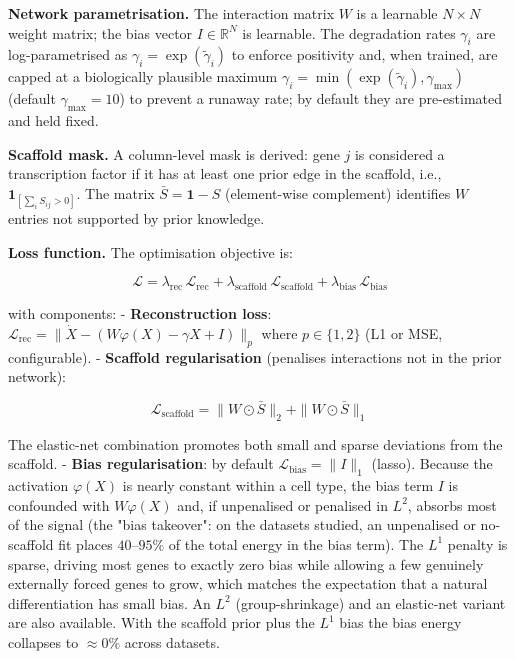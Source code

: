 \documentclass[11pt]{article}
\begin{document}
\textbf{Network parametrisation.} The interaction matrix $W$ is a learnable $N \times N$ weight matrix; the bias vector $I \in \mathbb{R}^N$ is learnable. The degradation rates $\gamma_i$ are log-parametrised as $\gamma_i = \exp(\tilde{\gamma}_i)$ to enforce positivity and, when trained, are capped at a biologically plausible maximum $\gamma_i = \min(\exp(\tilde{\gamma}_i), \gamma_{\max})$ (default $\gamma_{\max}=10$) to prevent a runaway rate; by default they are pre-estimated and held fixed.

\textbf{Scaffold mask.} A column-level mask is derived: gene $j$ is considered a transcription factor if it has at least one prior edge in the scaffold, i.e., $\mathbf{1}_{[\sum_i S_{ij} > 0]}$. The matrix $\bar{S} = \mathbf{1} - S$ (element-wise complement) identifies $W$ entries not supported by prior knowledge.

\textbf{Loss function.} The optimisation objective is:


\begin{equation}
\mathcal{L} = \lambda_{\text{rec}}\,\mathcal{L}_{\text{rec}} + \lambda_{\text{scaffold}}\,\mathcal{L}_{\text{scaffold}} + \lambda_{\text{bias}}\,\mathcal{L}_{\text{bias}} 
\end{equation}


with components:
- \textbf{Reconstruction loss}: $\mathcal{L}_{\text{rec}} = \|\dot{X} - (W\varphi(X) - \gamma X + I)\|_p$ where $p \in \{1, 2\}$ (L1 or MSE, configurable).
- \textbf{Scaffold regularisation} (penalises interactions not in the prior network):

\begin{equation}
\mathcal{L}_{\text{scaffold}} = \|W \odot \bar{S}\|_2 + \|W \odot \bar{S}\|_1 
\end{equation}

The elastic-net combination promotes both small and sparse deviations from the scaffold.
- \textbf{Bias regularisation}: by default $\mathcal{L}_{\text{bias}} = \|I\|_1$ (lasso). Because the activation $\varphi(X)$ is nearly constant within a cell type, the bias term $I$ is confounded with $W\varphi(X)$ and, if unpenalised or penalised in $L^2$, absorbs most of the signal (the "bias takeover": on the datasets studied, an unpenalised or no-scaffold fit places $40$--$95\%$ of the total energy in the bias term). The $L^1$ penalty is sparse, driving most genes to exactly zero bias while allowing a few genuinely externally forced genes to grow, which matches the expectation that a natural differentiation has small bias. An $L^2$ (group-shrinkage) and an elastic-net variant are also available. With the scaffold prior plus the $L^1$ bias the bias energy collapses to $\approx 0\%$ across datasets.
\end{document}
